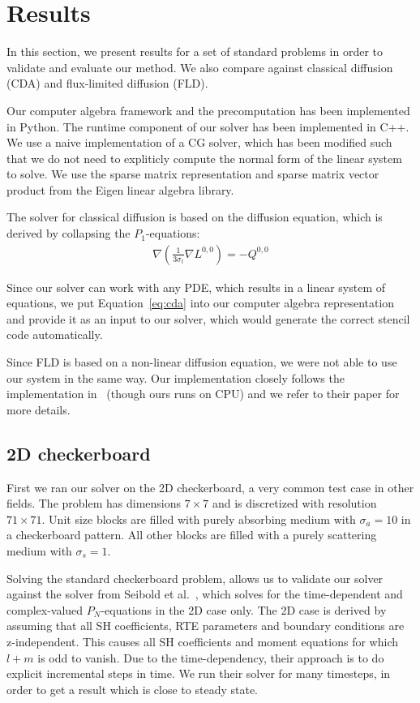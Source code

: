 \section{Results}
\label{sec:results}

In this section, we present results for a set of standard problems in order to validate and evaluate our method. We also compare against classical diffusion (CDA) and flux-limited diffusion (FLD).

Our computer algebra framework and the precomputation has been implemented in Python. The runtime component of our solver has been implemented in C++. We use a naive implementation of a CG solver, which has been modified such that we do not need to expliticly compute the normal form of the linear system to solve. We use the sparse matrix representation and sparse matrix vector product from the Eigen linear algebra library.

The solver for classical diffusion is based on the diffusion equation, which is derived by collapsing the $P_1$-equations:
\begin{align} 
\nabla\left(\frac{1}{3\sigma_t}\nabla L^{0,0}\right)  = -Q^{0,0}
\label{eq:cda}
\end{align}

Since our solver can work with any PDE, which results in a linear system of equations, we put Equation~\ref{eq:cda} into our computer algebra representation and provide it as an input to our solver, which would generate the correct stencil code automatically.

Since FLD is based on a non-linear diffusion equation, we were not able to use our system in the same way. Our implementation closely follows the implementation in~\cite{Koerner14} (though ours runs on CPU) and we refer to their paper for more details.

\subsection{2D checkerboard}

First we ran our solver on the 2D checkerboard, a very common test case in other fields. The problem has dimensions $7\times 7$ and is discretized with resolution $71\times 71$. Unit size blocks are filled with purely absorbing medium with $\sigma_a=10$ in a checkerboard pattern. All other blocks are filled with a purely scattering medium with $\sigma_s=1$.

Solving the standard checkerboard problem, allows us to validate our solver against the solver from Seibold et al.~\cite{Seibold14}, which solves for the time-dependent and complex-valued $P_N$-equations in the 2D case only. The 2D case is derived by assuming that all SH coefficients, RTE parameters and boundary conditions are z-independent. This causes all SH coefficients and moment equations for which $l+m$ is odd to vanish. Due to the time-dependency, their approach is to do explicit incremental steps in time. We run their solver for many timesteps, in order to get a result which is close to steady state.

